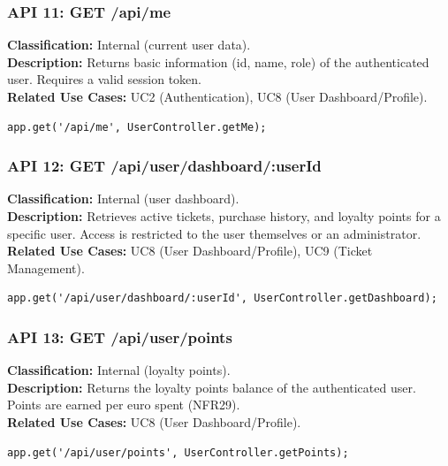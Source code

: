 \documentclass{article}
\begin{document}
\subsubsection*{API 11: GET /api/me}
\textbf{Classification:} Internal (current user data).\\
\textbf{Description:} Returns basic information (id, name, role) of the
authenticated user. Requires a valid session token.\\
\textbf{Related Use Cases:} UC2 (Authentication), UC8 (User Dashboard/Profile).
\begin{verbatim}
app.get('/api/me', UserController.getMe);
\end{verbatim}

\subsubsection*{API 12: GET /api/user/dashboard/:userId}
\textbf{Classification:} Internal (user dashboard).\\
\textbf{Description:} Retrieves active tickets, purchase history, and loyalty
points for a specific user. Access is restricted to the user themselves or an
administrator.\\
\textbf{Related Use Cases:} UC8 (User Dashboard/Profile), UC9 (Ticket Management).
\begin{verbatim}
app.get('/api/user/dashboard/:userId', UserController.getDashboard);
\end{verbatim}

\subsubsection*{API 13: GET /api/user/points}
\textbf{Classification:} Internal (loyalty points).\\
\textbf{Description:} Returns the loyalty points balance of the authenticated user.
Points are earned per euro spent (NFR29).\\
\textbf{Related Use Cases:} UC8 (User Dashboard/Profile).
\begin{verbatim}
app.get('/api/user/points', UserController.getPoints);
\end{verbatim}
\end{document}

